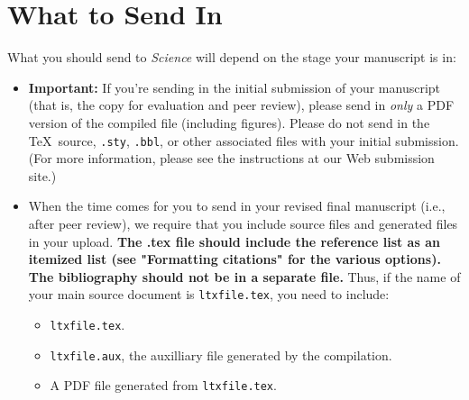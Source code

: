 \documentclass[12pt]{article}
\begin{document}
\section*{}











\section*{What to Send In}

What you should send to {\it Science\/} will depend on the stage your manuscript is in:

\begin{itemize}
\item {\bf Important:} If you're sending in the initial submission of
  your manuscript (that is, the copy for evaluation and peer review),
  please send in {\it only\/} a PDF version of the
  compiled file (including figures).  Please do not send in the \TeX\ 
  source, \texttt{.sty}, \texttt{.bbl}, or other associated files with
  your initial submission.  (For more information, please see the
  instructions at our Web submission site.)
\item When the time comes for you to send in your revised final
  manuscript (i.e., after peer review), we require that you include
   source files and generated files in your upload. {\bf The .tex file should include
the reference list as an itemized list (see "Formatting citations"  for the various options). The bibliography should not be in a separate file.}  
  Thus, if the
  name of your main source document is \texttt{ltxfile.tex}, you
  need to include:
\begin{itemize}
\item \texttt{ltxfile.tex}.
\item \texttt{ltxfile.aux}, the auxilliary file generated by the
  compilation.
\item A PDF file generated from
  \texttt{ltxfile.tex}.

\end{itemize}
\end{itemize}

\end{document}
